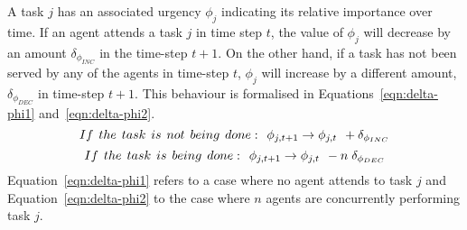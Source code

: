 \documentclass{intech}
\begin{document}
A task $j$ has an associated urgency $\phi_j$ indicating its relative importance over time.  If an agent attends a task $j$ in time step $t$, the value of $\phi_j$ will decrease by an amount $\delta_{\phi_{INC}}$ in the time-step $t+1$.  On the other hand, if a task has not been served by any of the agents in time-step $t$, $\phi_j$ will increase by a different amount, $\delta_{\phi_{DEC}}$ in time-step $t+1$.  This behaviour is formalised in Equations~\ref{eqn:delta-phi1} and~\ref{eqn:delta-phi2}.
\begin{equation}
 If\hspace*{0.15cm}the\hspace*{0.15cm} task\hspace*{0.15cm}is\hspace*{0.15cm}not\hspace*{0.15cm}being\hspace*{0.15cm} done:\hspace*{0.15cm} \phi_{j,t+1} \rightarrow \phi_{j,t} \hspace*{0.15cm} + \delta_{\phi_{INC}}
\label{eqn:delta-phi1}
\end{equation}
\begin{equation}
 If\hspace*{0.15cm}the \hspace*{0.15cm}task\hspace*{0.15cm}is\hspace*{0.15cm}being\hspace*{0.15cm}done:\hspace*{0.15cm}  \phi_{j,t+1} \rightarrow \phi_{j,t} \hspace*{0.15cm} - n\hspace*{0.10cm}\delta_{\phi_{DEC}}
\label{eqn:delta-phi2}
\end{equation}
Equation~\ref{eqn:delta-phi1} refers to a case where no agent attends to task $j$ and Equation~\ref{eqn:delta-phi2} to the case where $n$ agents are concurrently performing task $j$.
\end{document}
